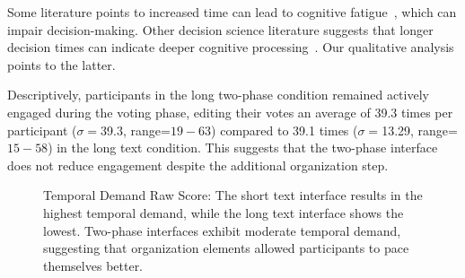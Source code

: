 Some literature points to increased time can lead to cognitive fatigue~\cite{kundingerReliableGroundTruth2020, karim2024examining}, which can impair decision-making. Other decision science literature suggests that longer decision times can indicate deeper cognitive processing~\cite{payneAdaptiveDecisionMaker1993, daniel2017thinking}. Our qualitative analysis points to the latter.

Descriptively, participants in the long two-phase condition remained actively engaged during the voting phase, editing their votes an average of 39.3 times per participant ($\sigma=$39.3, range=$19-63$) compared to 39.1 times ($\sigma=$13.29, range=$15-58$) in the long text condition. This suggests that the two-phase interface does not reduce engagement despite the additional organization step.

\begin{figure} %
    \centering
    \captionsetup{width=0.9\linewidth, justification=justified}
    \caption{Temporal Demand Raw Score: The short text interface results in the highest temporal demand, while the long text interface shows the lowest. Two-phase interfaces exhibit moderate temporal demand, suggesting that organization elements allowed participants to pace themselves better.}
    \label{fig:temporal_cog_score}
\end{figure}

